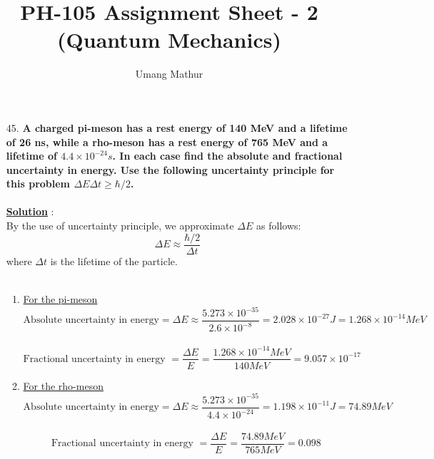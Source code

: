 \documentclass[10pt, a4paper]{article}
\begin{document}
	\title{PH-105 Assignment Sheet - 2 (Quantum Mechanics)}
	\date{}
	\author{Umang Mathur}
	\maketitle
	\begin{enumerate}
		\item[45.] {\bf A charged pi-meson has a rest energy of 140 MeV and a lifetime of 26 ns, while a rho-meson has a rest energy of 765 MeV and a lifetime of $4.4\times 10^{-24}s$. In each case find the absolute and fractional uncertainty in energy. Use the following uncertainty principle for this problem $\Delta E\Delta t \geq \hbar/2$. }\\\\
		{\underline {\bf Solution}} :\\
		By the use of uncertainty principle, we approximate $\Delta E$ as follows:
		\[ \Delta E\approx \frac{\hbar/2}{\Delta t} \]
		where $\Delta t$ is the lifetime of the particle.\\\\
		\begin{enumerate}
			\item {\underline {For the pi-meson}}\\
				\[ \text{Absolute uncertainty in energy} = \Delta E \approx \frac{5.273\times 10^{-35}}{2.6\times 10^{-8}} = 2.028\times 10^{-27} J = 1.268\times 10^{-14} MeV\]\\
				\[ \text{Fractional uncertainty in energy } = \frac{\Delta E}{E} = \frac{1.268\times 10^{-14} MeV}{140 MeV} = 9.057\times 10^{-17}\]
			\item {\underline {For the rho-meson}}\\
				\[ \text{Absolute uncertainty in energy} = \Delta E \approx \frac{5.273\times 10^{-35}}{4.4\times 10^{-24}} = 1.198\times 10^{-11} J = 74.89 MeV\]\\
				\[ \text{Fractional uncertainty in energy } = \frac{\Delta E}{E} = \frac{74.89 MeV}{765 MeV} = 0.098\]
		\end{enumerate}
	\end{enumerate}
\end{document}
